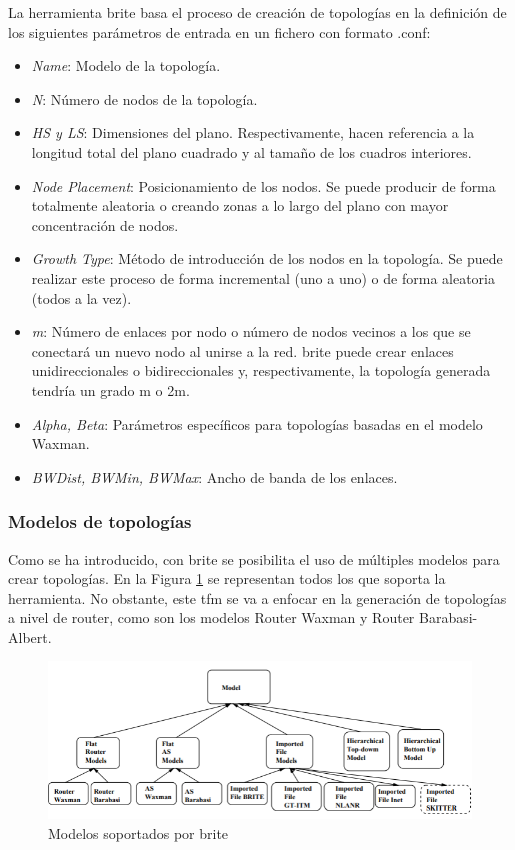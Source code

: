 La herramienta \gls{brite} basa el proceso de creación de topologías en la definición de los siguientes parámetros de entrada en un fichero con formato .conf:

\begin{itemize}
    \item \textit{Name}: Modelo de la topología.
    \item \textit{N}: Número de nodos de la topología.  
    \item \textit{HS y LS}: Dimensiones del plano. Respectivamente, hacen referencia a la longitud total del plano cuadrado y al tamaño de los cuadros interiores.
    \item \textit{Node Placement}: Posicionamiento de los nodos. Se puede producir de forma totalmente aleatoria o creando zonas a lo largo del plano con mayor concentración de nodos. 
    \item \textit{Growth Type}: Método de introducción de los nodos en la topología. Se puede realizar este proceso de forma incremental (uno a uno) o de forma aleatoria (todos a la vez). 
    \item \textit{m}: Número de enlaces por nodo o número de nodos vecinos a los que se conectará un nuevo nodo al unirse a la red. \gls{brite} puede crear enlaces unidireccionales o bidireccionales y, respectivamente, la topología generada tendría un grado m o 2m.
    \item \textit{Alpha, Beta}: Parámetros específicos para topologías basadas en el modelo Waxman.
    \item \textit{BWDist, BWMin, BWMax}: Ancho de banda de los enlaces.
\end{itemize}

\subsubsection{Modelos de topologías}
\label{sec:modelostopos}

Como se ha introducido, con \gls{brite} se posibilita el uso de múltiples modelos para crear topologías. En la Figura \ref{fig:brite} se representan todos los que soporta la herramienta. No obstante, este \gls{tfm} se va a enfocar en la generación de topologías a nivel de router, como son los modelos Router Waxman y Router Barabasi-Albert. 

\vspace{3mm}

\begin{figure}[h!]
    \centering
    \includegraphics[width=1\textwidth]{img/teoria/brite.PNG}
    \caption{Modelos soportados por \acrshort{brite} \cite{brite}}
    \label{fig:brite}
\end{figure}

